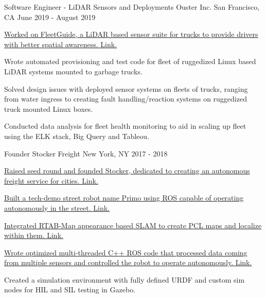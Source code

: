 \begin{cventries}
  \cventry
    {Software Engineer - LiDAR Sensors and Deployments} %
    {Ouster Inc.} %
    {San Francisco, CA} %
    {June 2019 - August 2019} %
    {
      \begin{cvitems} %
        \item {\href{https://www.fleetguide.io/}
                {Worked on FleetGuide, a LiDAR based sensor suite for trucks to provide drivers with better spatial awareness. \color{darkblue}Link.}}
        \item {Wrote automated provisioning and test code for fleet of ruggedized Linux based LiDAR systems mounted to garbage trucks.}
        \item {Solved design issues with deployed sensor systems on fleets of trucks, ranging from water ingress to creating fault handling/reaction
        systems on ruggedized truck mounted Linux boxes.}
        \item {Conducted data analysis for fleet health monitoring to aid in scaling up fleet using the ELK stack, Big Query and Tableou.}
      \end{cvitems}
    }

  \cventry
    {Founder} %
    {Stocker Freight} %
    {New York, NY} %
    {2017 - 2018} %
    {
      \begin{cvitems} %
        \item {\href{https://paulsammut.com/lib/exe/fetch.php/seed_deck_r14.pdf}
              {Raised seed round and founded Stocker, dedicated to creating an autonomous freight service for cities. \color{darkblue}Link.}}
        \item {\href{https://paulsammut.com/doku.php/primo_robot}
            {Built a tech-demo street robot name Primo using ROS capable of operating autonomously in the street. \color{darkblue}Link.}}
        \item {\href{https://paulsammut.com/doku.php/stereo_cameras}
            {Integrated RTAB-Map appearance based SLAM to create PCL maps and localize within them. \color{darkblue}Link.}}
        \item {\href{http://bit.ly/2T3d4sU} {Wrote optimized multi-threaded C++ ROS code that processed data coming from multiple sensors and controlled the robot to operate autonomously. \color{darkblue}Link.}}
        \item {Created a simulation environment with fully defined URDF and custom sim nodes for HIL and SIL testing in Gazebo.}
      \end{cvitems}
    }


\end{cventries}
